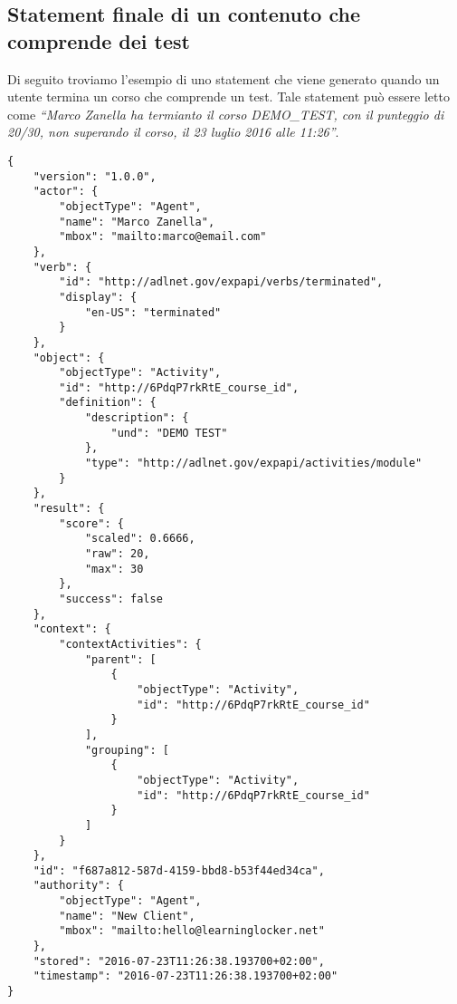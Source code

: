     \subsection{Statement finale di un contenuto che comprende dei test}
    Di seguito troviamo l'esempio di uno statement che viene generato quando un utente termina un corso che comprende un test. Tale statement può essere letto come \textit{``Marco Zanella ha termianto il corso DEMO\_TEST, con il punteggio di 20/30, non superando il corso, il 23 luglio 2016 alle 11:26''}.
\begin{lstlisting}
{
    "version": "1.0.0",
    "actor": {
        "objectType": "Agent",
        "name": "Marco Zanella",
        "mbox": "mailto:marco@email.com"
    },
    "verb": {
        "id": "http://adlnet.gov/expapi/verbs/terminated",
        "display": {
            "en-US": "terminated"
        }
    },
    "object": {
        "objectType": "Activity",
        "id": "http://6PdqP7rkRtE_course_id",
        "definition": {
            "description": {
                "und": "DEMO TEST"
            },
            "type": "http://adlnet.gov/expapi/activities/module"
        }
    },
    "result": {
        "score": {
            "scaled": 0.6666,
            "raw": 20,
            "max": 30
        },
        "success": false
    },
    "context": {
        "contextActivities": {
            "parent": [
                {
                    "objectType": "Activity",
                    "id": "http://6PdqP7rkRtE_course_id"
                }
            ],
            "grouping": [
                {
                    "objectType": "Activity",
                    "id": "http://6PdqP7rkRtE_course_id"
                }
            ]
        }
    },
    "id": "f687a812-587d-4159-bbd8-b53f44ed34ca",
    "authority": {
        "objectType": "Agent",
        "name": "New Client",
        "mbox": "mailto:hello@learninglocker.net"
    },
    "stored": "2016-07-23T11:26:38.193700+02:00",
    "timestamp": "2016-07-23T11:26:38.193700+02:00"
}
\end{lstlisting}